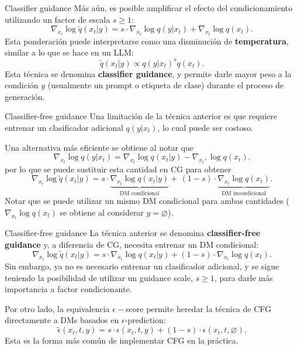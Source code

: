 \documentclass{beamer}
\begin{document}
\begin{frame}{Classifier guidance}
    Más aún, es posible amplificar el efecto del condicionamiento utilizando un factor de escala $s\geq1$:
    \begin{equation*}
        \nabla_{x_t}\log \tilde q(x_t|y) = s\cdot\nabla_{x_t}\log q(y|x_t) + \nabla_{x_t}\log q(x_t).
    \end{equation*}
    Esta ponderación puede interpretarse como una disminución de \textbf{temperatura}, similar a lo que se hace en un LLM:
    \begin{equation*}
        \tilde q(x_t|y) \propto q(y|x_t)^s q(x_t).
    \end{equation*}
    Esta técnica se denomina \textbf{classifier guidance}, y permite darle mayor peso a la condición $y$ (usualmente un prompt o etiqueta de clase) durante el proceso de generación.
\end{frame}

\begin{frame}{Classifier-free guidance}
    Una limitación de la técnica anterior es que requiere entrenar un clasificador adicional $q(y|x_t)$, lo cual puede ser costoso.

    Una alternativa más eficiente se obtiene al notar que
    \begin{equation*}
        \nabla_{x_t}\log q(y|x_t) = \nabla_{x_t}\log q(x_t|y) - \nabla_{x_t},\log q(x_t).
    \end{equation*}
    por lo que se puede sustituir esta cantidad en CG para obtener
    \begin{equation*}
        \nabla_{x_t}\log \tilde q(x_t|y) = s\cdot\underbrace{\nabla_{x_t}\log q(x_t|y)}_{ \text{DM condicional}} +\, (1-s)\cdot\underbrace{\nabla_{x_t}\log q(x_t)}_{\text{DM incondicional}}.
    \end{equation*}
    Notar que se puede utilizar un mismo DM condicional para ambas cantidades ($\nabla_{x_t}\log q(x_t)$ se obtiene al considerar $y=\varnothing$).
\end{frame}

\begin{frame}{Classifier-free guidance}
    La técnica anterior se denomina \textbf{classifier-free guidance} y, a diferencia de CG, necesita entrenar un DM condicional:
    \begin{equation*}
        \nabla_{x_t}\log \tilde q(x_t|y) = s\cdot\nabla_{x_t}\log q(x_t|y) + (1-s)\cdot\nabla_{x_t}\log q(x_t).
    \end{equation*}
    Sin embargo, ya no es necesario entrenar un clasificador adicional, y se sigue teniendo la posibilidad de utilizar un guidance scale, $s\geq1$, para darle más importancia a factor condicionante.

    Por otro lado, la equivalencia $\epsilon-$score permite heredar la técnica de CFG directamente a DMs basados en $\epsilon$-prediction:
    \begin{equation*}
        \tilde\epsilon(x_t,t,y) = s\cdot\epsilon(x_t,t,y) + (1-s)\cdot\epsilon(x_t,t,\varnothing).
    \end{equation*}
    Esta es la forma más común de implementar CFG en la práctica.
\end{frame}
\end{document}
